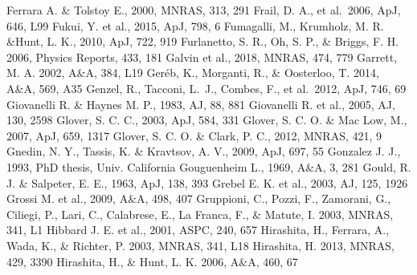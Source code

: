 \begin{thebibliography}{99}
\begin{multicols}{2}
{	Ferrara A. \& Tolstoy E., 2000, MNRAS, 313, 291
    Frail, D. A., et al.\ 2006, ApJ, 646, L99
        Fukui, Y. et al., 2015, ApJ, 798, 6
	Fumagalli, M., Krumholz, M. R. \&Hunt, L. K., 2010, ApJ, 722, 919
    Furlanetto, S. R., Oh, S. P., \& Briggs, F. H. 2006, Physics Reports, 433, 181
    	Galvin et al., 2018, MNRAS, 474, 779
    	Garrett, M. A. 2002, A\&A, 384, L19
    	Ger\'{e}b, K., Morganti, R., \& Oosterloo, T. 2014, A\&A, 569, A35
	Genzel, R., Tacconi, L.~J., Combes, F., et al.\ 2012, ApJ, 746, 69 
	Giovanelli R. \& Haynes M. P., 1983, AJ, 88, 881
    	Giovanelli R. et al., 2005, AJ, 130, 2598
	Glover, S. C. C., 2003, ApJ, 584, 331
      Glover, S. C. O. \& Mac Low, M., 2007, ApJ, 659, 1317
	Glover, S. C. O. \& Clark, P. C., 2012, MNRAS, 421, 9
	Gnedin, N. Y., Tassis, K. \& Kravtsov, A. V., 2009, ApJ, 697, 55
	Gonzalez J. J., 1993, PhD thesis, Univ. California
	Gouguenheim L., 1969, A\&A, 3, 281
	Gould, R. J. \& Salpeter, E. E., 1963, ApJ, 138, 393
	Grebel E. K. et al., 2003, AJ, 125, 1926
	Grossi M. et al., 2009, A\&A, 498, 407
	Gruppioni, C., Pozzi, F., Zamorani, G., Ciliegi, P., Lari, C., Calabrese, E.,
    	La Franca, F., \& Matute, I. 2003, MNRAS, 341, L1
	Hibbard J. E. et al., 2001, ASPC, 240, 657
	Hirashita, H., Ferrara, A., Wada, K., \& Richter, P. 2003, MNRAS, 341, L18
    	Hirashita, H. 2013, MNRAS, 429, 3390
    	Hirashita, H., \& Hunt, L. K. 2006, A\&A, 460, 67
}
\end{multicols}
\end{thebibliography}
